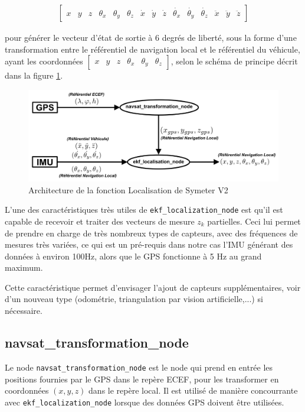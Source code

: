 \documentclass[12pt,a4paper]{report}
\begin{document}
	\begin{gather}
		\begin{bmatrix}
			x&y&z&\theta_x&\theta_y&\theta_z&
			\dot{x}&\dot{y}&\dot{z}&\dot{\theta_x}&\dot{\theta_y}&\dot{\theta_z} &\ddot{x}&\ddot{y}&\ddot{z}
		\end{bmatrix}
	\end{gather}
	
	\para pour générer le vecteur d'état de sortie à 6 degrés de liberté, sous la forme d'une transformation entre le référentiel de navigation local et le référentiel du véhicule, ayant les coordonnées $\begin{bmatrix}
	x&y&z&\theta_x&\theta_y&\theta_z \end{bmatrix}$, selon le schéma de principe décrit dans la figure \ref{fig:archilocalisation}.

	
	\begin{figure}[h!]
		\centering
		\includegraphics[width=1\linewidth]{img/archilocalisation}
		\caption[archilocalisation]{Architecture de la fonction Localisation de Symeter V2}
		\label{fig:archilocalisation}
	\end{figure}

	\para L'une des caractéristiques très utiles de \verb|ekf_localization_node| est qu'il est capable de recevoir et traiter des vecteurs de mesure $z_k$ partielles. Ceci lui permet de prendre en charge de très nombreux types de capteurs, avec des fréquences de mesures très variées, ce qui est un pré-requis dans notre cas l'IMU générant des données à environ 100Hz, alors que le GPS fonctionne à 5 Hz au grand maximum. 
	
	\para Cette caractéristique permet d'envisager l'ajout de capteurs supplémentaires, voir d'un nouveau type (odométrie, triangulation par vision artificielle,...) si nécessaire.
	
	\subsection{navsat\_transformation\_node}
	Le node \verb|navsat_transformation_node| est le node qui prend en entrée les positions fournies par le GPS dans le repère ECEF, pour les transformer en coordonnées $(x,y,z)$ dans le repère local. Il est utilisé de manière concourrante avec \verb|ekf_localization_node| lorsque des données GPS doivent être utilisées.
	
\end{document}
